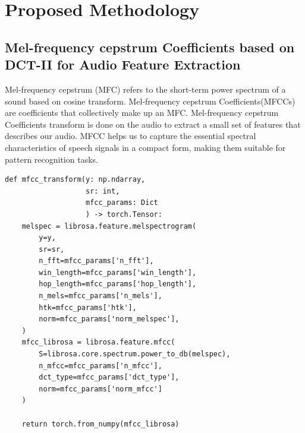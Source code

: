 \documentclass[fleqn, 10pt, twoside]{IOEGC}
\begin{document}
\section{Proposed Methodology}
\subsection{Mel-frequency cepstrum Coefficients based on DCT-II for Audio Feature Extraction
}
Mel-frequency cepstrum (MFC) refers to the short-term power spectrum of a sound
based on cosine transform. Mel-frequency cepstrum Coefficients(MFCCs) are coefficients that collectively make up an MFC. Mel-frequency cepstrum Coefficients transform is done on the audio to extract a small set of features that describes our audio.
MFCC helps us to capture the essential spectral characteristics of speech signals in a
compact form, making them suitable for pattern recognition tasks.
\begin{lstlisting}[style=mystyle,caption={MFCC Transformation Function},captionpos=b]
def mfcc_transform(y: np.ndarray,
                   sr: int,
                   mfcc_params: Dict
                   ) -> torch.Tensor:
    melspec = librosa.feature.melspectrogram(
        y=y,
        sr=sr,
        n_fft=mfcc_params['n_fft'],
        win_length=mfcc_params['win_length'],
        hop_length=mfcc_params['hop_length'],
        n_mels=mfcc_params['n_mels'],
        htk=mfcc_params['htk'],
        norm=mfcc_params['norm_melspec'],
    )
    mfcc_librosa = librosa.feature.mfcc(
        S=librosa.core.spectrum.power_to_db(melspec),
        n_mfcc=mfcc_params['n_mfcc'],
        dct_type=mfcc_params['dct_type'],
        norm=mfcc_params['norm_mfcc']
    )

    return torch.from_numpy(mfcc_librosa)
\end{lstlisting}
\end{document}
